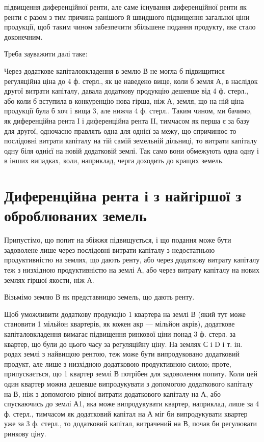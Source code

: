 \parcont{}  %
підвищення диференційної ренти, але саме існування диференційної ренти як
ренти є разом з тим причина ранішого й швидшого підвищення загальної ціни
продукції, щоб таким чином забезпечити збільшене подання продукту, яке стало доконечним.

Треба зауважити далі таке:

Через додаткове капіталовкладення в землю В не могла б підвищитися
регуляційна ціна до 4 ф. стерл., як це наведено вище, коли б земля А, в наслідок
другої витрати капіталу, давала додаткову продукцію дешевше від 4 ф.
стерл., або коли б вступила в конкуренцію нова гірша, ніж А, земля, що на
ній ціна продукції була б хоч і вища 3, але нижча 4 ф. стерл.. Таким чином,
ми бачимо, як диференційна рента І і диференційна рента II, тимчасом як
перша є за базу для другої, одночасно правлять одна для однієї за межу, що
спричинює то послідовні витрати капіталу на тій самій земельній дільниці, то
витрати капіталу одну біля однієї на новій додатковій землі. Так само вони
обмежують одна одну і в інших випадках, коли, наприклад, черга доходить до
кращих земель.

\section{Диференційна рента і з найгіршої з оброблюваних земель}

Припустімо, що попит на збіжжя підвищується, і що подання може бути
задоволене лише через послідовні витрати капіталу з недостатньою продуктивністю
на землях, що дають ренту, або через додаткову витрату капіталу
теж з низхідною продуктивністю на землі А, або через витрату капіталу на
нових землях гіршої якости, ніж А.

Візьмімо землю В як представницю земель, що дають ренту.

Щоб уможливити додаткову продукцію 1 квартера на землі В (який
тут може становити 1 мільйон квартерів, як кожен акр — мільйон акрів), додаткове
капіталовкладення вимагає підвищення ринкової ціни понад 3 ф. стерл.
за квартер, що були до цього часу за регуляційну ціну. На землях С і D і т.
ін. родах землі з найвищою рентою, теж може бути випродуковано додатковий
продукт, але лише з низхідною додатковою продуктивною силою; проте,
припускається, що 1 квартер землі В потрібен для задоволення попиту.
Коли цей один квартер можна дешевше випродукувати з допомогою додаткового
капіталу на В, ніж з допомогою рівної витрати додаткового капіталу
на А, або спускаючись до землі А1, яка може випродукувати квартер, наприклад,
лише за 4 ф. стерл., тимчасом як додатковий капітал на А міг би випродукувати
квартер уже за 3  ф. стерл., то додатковий капітал, витрачений на
В, почав би регулювати ринкову ціну.

